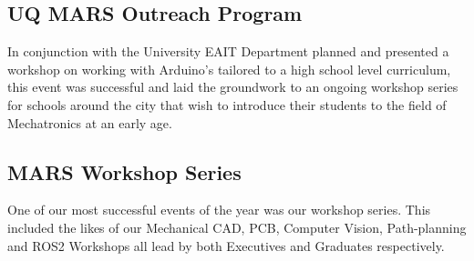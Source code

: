 \documentclass[a4paper,12pt]{report}
\begin{document}
\vspace{-1.8cm}

\subsection{UQ MARS Outreach Program}
In conjunction with the University EAIT Department planned and presented a workshop on working with Arduino's tailored to a high school level curriculum, this event was successful and laid the groundwork to an ongoing workshop series for schools around the city that wish to introduce their students to the field of Mechatronics at an early age.

\vspace{-1.8cm}

\subsection{MARS Workshop Series}
One of our most successful events of the year was our workshop series. This included the likes of our Mechanical CAD, PCB, Computer Vision, Path-planning and ROS2 Workshops all lead by both Executives and Graduates respectively.

\vspace{-1.5cm}
\end{document}
